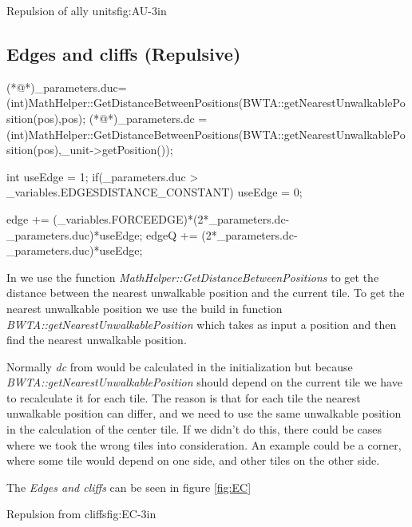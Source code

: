 			{Repulsion of ally units}{fig:AU}{-3in}

	\subsection{Edges and cliffs (Repulsive)}
	\begin{Sourcecode}[caption=Edges and cliffs]
(*@\lnote@*)_parameters.duc= (int)MathHelper::GetDistanceBetweenPositions(BWTA::getNearestUnwalkablePosition(pos),pos);
(*@\lnote@*)_parameters.dc = (int)MathHelper::GetDistanceBetweenPositions(BWTA::getNearestUnwalkablePosition(pos),_unit->getPosition());

int useEdge = 1;
if(_parameters.duc > _variables.EDGESDISTANCE_CONSTANT)
	useEdge = 0;

edge += (_variables.FORCEEDGE)*(2*_parameters.dc-_parameters.duc)*useEdge;
edgeQ += (2*_parameters.dc-_parameters.duc)*useEdge;
\end{Sourcecode}	
    In  we use the function \textit{MathHelper::GetDistanceBetweenPositions} to get the distance between the nearest unwalkable position and the current tile. To get the nearest unwalkable position we use the build in function \textit{BWTA::getNearestUnwalkablePosition} which takes as input a position and then find the nearest unwalkable position.

	
	Normally \textit{dc} from  would be calculated in the initialization but because \\ \textit{BWTA::getNearestUnwalkablePosition} should depend on the current tile we have to recalculate it for each tile. The reason is that for each tile the nearest unwalkable position can differ, and we need to use the same unwalkable position in the calculation of the center tile. If we didn't do this, there could be cases where 
	we took the wrong tiles into consideration. An example could be a corner, where some tile would depend on one side, and other tiles on the other side.
	
	The \textit{Edges and cliffs} can be seen in figure \ref{fig:EC}

			{Repulsion from cliffs}{fig:EC}{-3in}
